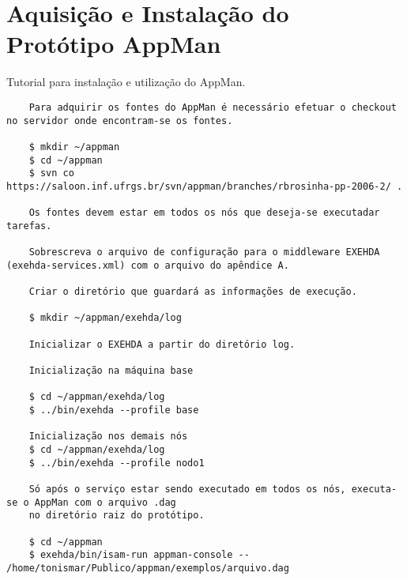 \chapter{Aquisição e Instalação do Protótipo AppMan}
\label{anexo:appman}

Tutorial para instalação e utilização do AppMan.

\begin{scriptsize}
\begin{verbatim}
	Para adquirir os fontes do AppMan é necessário efetuar o checkout no servidor onde encontram-se os fontes.

	$ mkdir ~/appman
	$ cd ~/appman	
	$ svn co https://saloon.inf.ufrgs.br/svn/appman/branches/rbrosinha-pp-2006-2/ .
	
	Os fontes devem estar em todos os nós que deseja-se executadar tarefas.
	
	Sobrescreva o arquivo de configuração para o middleware EXEHDA (exehda-services.xml) com o arquivo do apêndice A.
	
	Criar o diretório que guardará as informações de execução.
	
	$ mkdir ~/appman/exehda/log
	
	Inicializar o EXEHDA a partir do diretório log.
	
	Inicialização na máquina base
	
	$ cd ~/appman/exehda/log
	$ ../bin/exehda --profile base
	
	Inicialização nos demais nós
	$ cd ~/appman/exehda/log
	$ ../bin/exehda --profile nodo1
	
	Só após o serviço estar sendo executado em todos os nós, executa-se o AppMan com o arquivo .dag
	no diretório raiz do protótipo.
	
	$ cd ~/appman
	$ exehda/bin/isam-run appman-console -- /home/tonismar/Publico/appman/exemplos/arquivo.dag
	
\end{verbatim}
\end{scriptsize}
